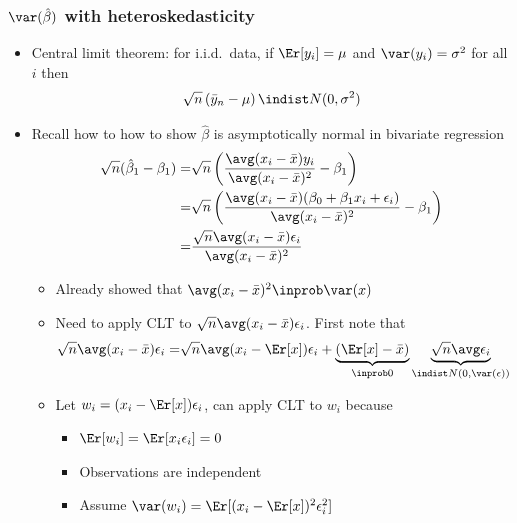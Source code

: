 \begin{frame}[allowframebreaks]\frametitle{$\var(\hat{\beta})$ with heteroskedasticity}
  \begin{itemize}
  \item \alert{Central limit theorem}: for i.i.d.\ data, if
    $\Er[y_i] = \mu$ and $\var(y_i) = \sigma^2$ for all $i$ then 
    \[ \sqrt{n}\left(\bar{y}_n - \mu \right) \indist N(0,\sigma^2) \]
  \item Recall how to how to show $\hat{\beta}$ is asymptotically
    normal in bivariate regression 
    \begin{align*}
      \sqrt{n}(\hat{\beta}_1 - \beta_1) = & \sqrt{n} \left( \frac{\avg (x_i - \bar{x}) y_i }
        {\avg (x_i  - \bar{x})^2} - \beta_1 \right) \\
      = & \sqrt{n}\left(  \frac{\avg (x_i - \bar{x}) (\beta_0 +
          \beta_1 x_i + \epsilon_i) }
        {\avg (x_i  - \bar{x})^2} - \beta_1 \right) \\
      = & \frac{\sqrt{n} \avg (x_i - \bar{x}) \epsilon_i} {\avg (x_i -
        \bar{x})^2} 
    \end{align*}
    \begin{itemize}
    \item Already showed that $\avg (x_i - \bar{x})^2 \inprob \var(x)$
    \item Need to apply CLT to $\sqrt{n} \avg (x_i-\bar{x}) \epsilon_i$. First note that
      {\footnotesize{
      \begin{align*}
        \sqrt{n} \avg (x_i-\bar{x})\epsilon_i = & \sqrt{n}\avg (x_i - \Er[x])\epsilon_i +
                                                  \underbrace{(\Er[x]
                                                  -
                                                  \bar{x})}_{\inprob
                                                  0}
                                                  \underbrace{\sqrt{n}
                                                  \avg
                                                  \epsilon_i}_{\indist
        N(0,\var(\epsilon))} \\
      \end{align*}        
      }}
    \item Let $w_i = (x_i -\Er[x])\epsilon_i$, can apply CLT to $w_i$
      because
      \begin{itemize}
      \item $\Er[w_i] = \Er[ x_i \epsilon_i ] = 0$
      \item Observations are independent
      \item Assume $\var(w_i) = \Er[(x_i-\Er[x])^2 \epsilon_i^2]$

\end{itemize}
\end{itemize}
\end{itemize}
\end{frame}
